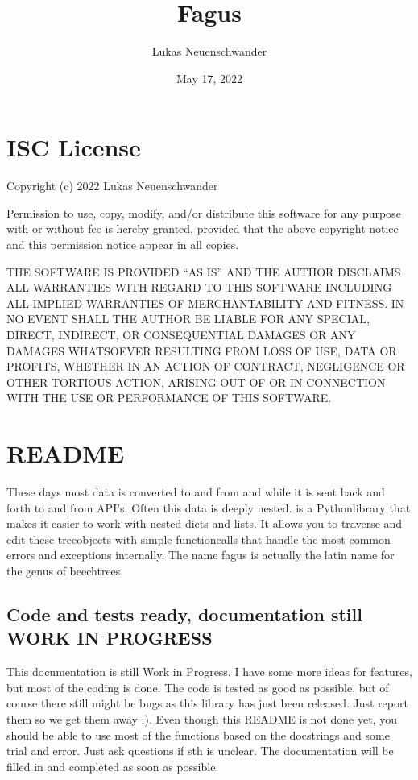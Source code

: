 \documentclass[a4paper,10pt,english]{sphinxmanual}
\title{Fagus}
\date{May 17, 2022}
\author{Lukas Neuenschwander}
\begin{document}
\pagestyle{empty}
\sphinxmaketitle
\pagestyle{plain}
\sphinxtableofcontents
\pagestyle{normal}
\label{\detokenize{index::doc}}


\sphinxstepscope


\chapter{ISC License}
\label{\detokenize{LICENSE:isc-license}}\label{\detokenize{LICENSE::doc}}
\sphinxAtStartPar
Copyright (c) 2022 Lukas Neuenschwander

\sphinxAtStartPar
Permission to use, copy, modify, and/or distribute this software for any purpose with or without fee is hereby granted, provided that the above copyright notice and this permission notice appear in all copies.

\sphinxAtStartPar
THE SOFTWARE IS PROVIDED “AS IS” AND THE AUTHOR DISCLAIMS ALL WARRANTIES WITH REGARD TO THIS SOFTWARE INCLUDING ALL IMPLIED WARRANTIES OF MERCHANTABILITY AND FITNESS. IN NO EVENT SHALL THE AUTHOR BE LIABLE FOR ANY SPECIAL, DIRECT, INDIRECT, OR CONSEQUENTIAL DAMAGES OR ANY DAMAGES WHATSOEVER RESULTING FROM LOSS OF USE, DATA OR PROFITS, WHETHER IN AN ACTION OF CONTRACT, NEGLIGENCE OR OTHER TORTIOUS ACTION, ARISING OUT OF OR IN CONNECTION WITH THE USE OR PERFORMANCE OF THIS SOFTWARE.

\sphinxstepscope


\chapter{README}
\label{\detokenize{README:readme}}\label{\detokenize{README::doc}}
\sphinxAtStartPar
These days most data is converted to and from  and  while it is sent back and forth to and from API’s. Often this data is deeply nested.  is a Python\sphinxhyphen{}library that makes it easier to work with nested dicts and lists. It allows you to traverse and edit these tree\sphinxhyphen{}objects with simple function\sphinxhyphen{}calls that handle the most common errors and exceptions internally. The name fagus is actually the latin name for the genus of beech\sphinxhyphen{}trees.


\section{Code and tests ready, documentation still WORK IN PROGRESS}
\label{\detokenize{README:code-and-tests-ready-documentation-still-work-in-progress}}
\sphinxAtStartPar
This documentation is still Work in Progress. I have some more ideas for features, but most of the coding is done. The code is tested as good as possible, but of course there still might be bugs as this library has just been released. Just report them so we get them away ;). Even though this README is not done yet, you should be able to use most of the functions based on the docstrings and some trial and error. Just ask questions  if sth is unclear. The documentation will be filled in and completed as soon as possible.
\end{document}
